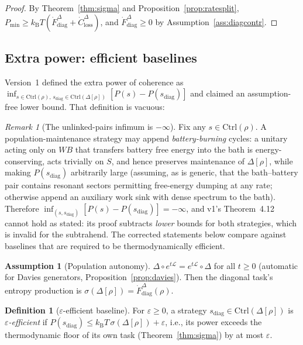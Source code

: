 \documentclass[11pt,a4paper]{article}
\theoremstyle{plain}
\theoremstyle{definition}
\newtheorem{definition}[theorem]{Definition}
\newtheorem{assumption}[theorem]{Assumption}
\theoremstyle{remark}
\newtheorem{remark}[theorem]{Remark}
\newcommand{\kB}{k_{\mathrm{B}}}
\newcommand{\Ctrl}{\mathrm{Ctrl}}
\newcommand{\Pmin}{P_{\min}}
\newcommand{\Closs}{\dot{C}^{\Delta}_{\mathrm{loss}}}
\newcommand{\Fdiag}{\dot{F}^{\Delta}_{\mathrm{diag}}}
\begin{document}
\begin{proof}
By Theorem~\ref{thm:sigma} and Proposition~\ref{prop:ratesplit},
$\Pmin \ge \kB T(\Fdiag + \Closs)$, and $\Fdiag \ge 0$ by
Assumption~\ref{ass:diagcontr}.
\end{proof}

\subsection{Extra power: efficient baselines}\label{sec:extra}

Version~1 defined the extra power of coherence as
$\inf_{s\in\Ctrl(\rho),\, s_{\mathrm{diag}}\in\Ctrl(\Delta[\rho])}
\left[P(s) - P(s_{\mathrm{diag}})\right]$ and claimed an assumption-free lower
bound. That definition is vacuous:

\begin{remark}[The unlinked-pairs infimum is $-\infty$]\label{rem:vacuous}
Fix any $s \in \Ctrl(\rho)$. A population-maintenance strategy may append
\emph{battery-burning} cycles: a unitary acting only on $W\!B$ that transfers
battery free energy into the bath is energy-conserving, acts trivially on $S$,
and hence preserves maintenance of $\Delta[\rho]$, while making
$P(s_{\mathrm{diag}})$ arbitrarily large (assuming, as is generic, that the
bath--battery pair contains resonant sectors permitting free-energy dumping at
any rate; otherwise append an auxiliary work sink with dense spectrum to the
bath). Therefore
$\inf_{(s, s_{\mathrm{diag}})}[P(s) - P(s_{\mathrm{diag}})] = -\infty$, and
v1's Theorem~4.12 cannot hold as stated: its proof subtracts \emph{lower}
bounds for both strategies, which is invalid for the subtrahend. The corrected
statements below compare against baselines that are required to be
thermodynamically efficient.
\end{remark}

\begin{assumption}[Population autonomy]\label{ass:autonomy}
$\Delta \circ e^{t\mathcal{L}} = e^{t\mathcal{L}} \circ \Delta$ for all
$t \ge 0$ (automatic for Davies generators,
Proposition~\ref{prop:davies}). Then the diagonal task's entropy production is
$\sigma(\Delta[\rho]) = \Fdiag(\rho)$.
\end{assumption}

\begin{definition}[$\varepsilon$-efficient baseline]\label{def:efficient}
For $\varepsilon \ge 0$, a strategy
$s_{\mathrm{diag}} \in \Ctrl(\Delta[\rho])$ is \emph{$\varepsilon$-efficient}
if $P(s_{\mathrm{diag}}) \le \kB T\,\sigma(\Delta[\rho]) + \varepsilon$, i.e.,
its power exceeds the thermodynamic floor of its own task
(Theorem~\ref{thm:sigma}) by at most $\varepsilon$.
\end{definition}
\end{document}
